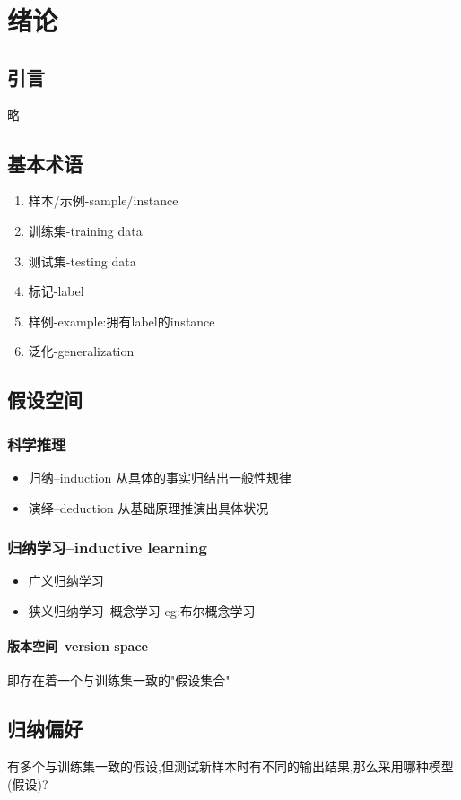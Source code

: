 \setcounter{page}{1}
\chapter{绪论}
\section{引言}
略
\section{基本术语}
\begin{enumerate}[label=(\roman*)]
    \item 样本/示例-sample/instance
    \item 训练集-training data
    \item 测试集-testing data
    \item 标记-label 
    \item 样例-example:拥有label的instance
    \item 泛化-generalization
\end{enumerate}
\section{假设空间}
\subsection{科学推理}
\begin{itemize}
    \item 归纳--induction
    从具体的事实归结出一般性规律
    \item 演绎--deduction
    从基础原理推演出具体状况
\end{itemize}
\subsection{归纳学习--inductive learning}
\begin{itemize}
    \item 广义归纳学习
    \item 狭义归纳学习--概念学习
    eg:布尔概念学习
\end{itemize}
\subsubsection{版本空间--version space}
即存在着一个与训练集一致的"假设集合"
\section{归纳偏好}
有多个与训练集一致的假设,但测试新样本时有不同的输出结果,那么采用哪种模型(假设)?
